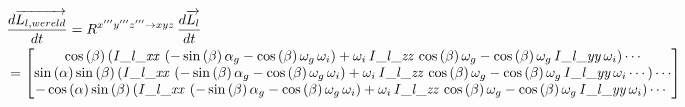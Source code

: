 \begin{align*}
&\frac{d\overrightarrow{L_{l,wereld}}}{dt}=R^{x'''y'''z''' \rightarrow xyz}\,\frac{d\overrightarrow{L_{l}}}{dt}\\
&=\begin{bmatrix}
\cos \left( \beta \right)  \left( {\it 
I\_l\_xx}\, \left( -\sin \left( \beta \right) \alpha_{g}-\cos \left( 
\beta \right) \omega_{g}\,\omega_{i} \right) +\omega_{i}\,{\it 
I\_l\_zz}\,\cos \left( \beta \right) \omega_{g}-\cos \left( \beta
 \right) \omega_{g}\,{\it I\_l\_yy}\,\omega_{i} \right)\cdots
\\ 
\sin \left( \alpha \right) \sin \left( 
\beta \right)  \left( {\it I\_l\_xx}\, \left( -\sin \left( \beta
 \right) \alpha_{g}-\cos \left( \beta \right) \omega_{g}\,\omega_{i}
 \right) +\omega_{i}\,{\it I\_l\_zz}\,\cos \left( \beta \right) \omega
_{g}-\cos \left( \beta \right) \omega_{g}\,{\it I\_l\_yy}\,\omega_{i}\cdots\right)\cdots 
\\ 
-\cos \left( \alpha
 \right) \sin \left( \beta \right)  \left( {\it I\_l\_xx}\, \left( -
\sin \left( \beta \right) \alpha_{g}-\cos \left( \beta \right) \omega_
{g}\,\omega_{i} \right) +\omega_{i}\,{\it I\_l\_zz}\,\cos \left( \beta
 \right) \omega_{g}-\cos \left( \beta \right) \omega_{g}\,{\it 
I\_l\_yy}\,\omega_{i}\right)\cdots\
\end{bmatrix}
\end{align*}

